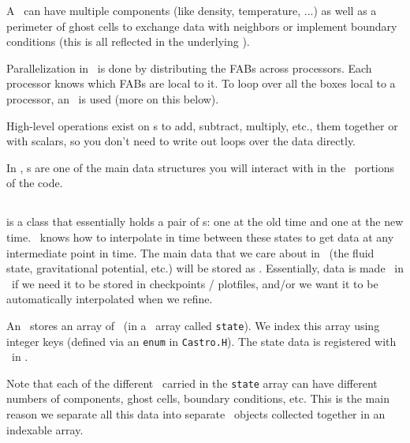 A \multifab\ can have multiple components (like density, temperature,
...) as well as a perimeter of ghost cells to exchange data with
neighbors or implement boundary conditions (this is all reflected in
the underlying \farraybox).

Parallelization in \boxlib\ is done by distributing the FABs across
processors.  Each processor knows which FABs are local to it.  To loop
over all the boxes local to a processor, an \mfiter\ is used (more
on this below).

High-level operations exist on \multifab s to add, subtract, multiply,
etc., them together or with scalars, so you don't need to write out
loops over the data directly.

In \castro, \multifab s are one of the main data structures you will
interact with in the \cpp\ portions of the code.


\subsection{\statedata}

\code{\statedata} is a class that essentially holds a pair of \multifab s: one
at the old time and one at the new time.  \boxlib\ knows how to
interpolate in time between these states to get data at any
intermediate point in time.  The main data that we care about in
\castro\ (the fluid state, gravitational potential, etc.) will be
stored as \statedata.  Essentially, data is made \statedata\ in
\castro\ if we need it to be stored in checkpoints / plotfiles, and/or
we want it to be automatically interpolated when we refine.

An \amrlevel\ stores an array of \statedata\ (in a \cpp\ array
called {\tt state}).  We index this array using integer keys (defined
via an {\tt enum} in {\tt Castro.H}).  The state data is registered
with \boxlib\ in .

Note that each of the different \statedata\ carried in the {\tt state}
array can have different numbers of components, ghost cells, boundary
conditions, etc.  This is the main reason we separate all this data
into separate \statedata\ objects collected together in an indexable
array.

